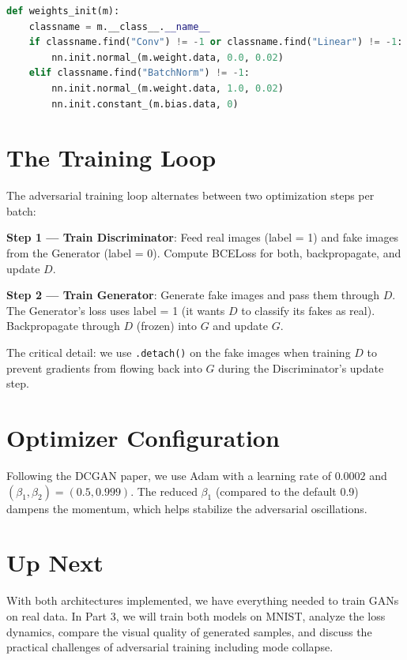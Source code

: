 \documentclass[12pt]{article}
\begin{document}
\begin{lstlisting}[language=Python]
def weights_init(m):
    classname = m.__class__.__name__
    if classname.find("Conv") != -1 or classname.find("Linear") != -1:
        nn.init.normal_(m.weight.data, 0.0, 0.02)
    elif classname.find("BatchNorm") != -1:
        nn.init.normal_(m.weight.data, 1.0, 0.02)
        nn.init.constant_(m.bias.data, 0)
\end{lstlisting}

\section{The Training Loop}
The adversarial training loop alternates between two optimization steps per batch:

\textbf{Step 1 --- Train Discriminator}: Feed real images (label = 1) and fake images from the Generator (label = 0). Compute BCELoss for both, backpropagate, and update $D$.

\textbf{Step 2 --- Train Generator}: Generate fake images and pass them through $D$. The Generator's loss uses label = 1 (it wants $D$ to classify its fakes as real). Backpropagate through $D$ (frozen) into $G$ and update $G$.

The critical detail: we use \texttt{.detach()} on the fake images when training $D$ to prevent gradients from flowing back into $G$ during the Discriminator's update step.

\section{Optimizer Configuration}
Following the DCGAN paper, we use Adam with a learning rate of $0.0002$ and $(\beta_1, \beta_2) = (0.5, 0.999)$. The reduced $\beta_1$ (compared to the default 0.9) dampens the momentum, which helps stabilize the adversarial oscillations.

\section{Up Next}
With both architectures implemented, we have everything needed to train GANs on real data. In Part 3, we will train both models on MNIST, analyze the loss dynamics, compare the visual quality of generated samples, and discuss the practical challenges of adversarial training including mode collapse.
\end{document}
